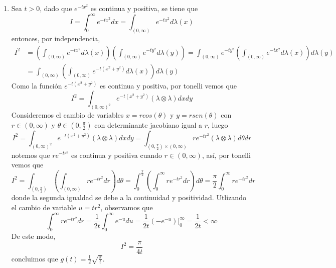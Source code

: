 \documentclass{article}
\begin{document}
\begin{enumerate}
    \item Sea $t>0$, dado que $e^{-tx^{2}}$ es continua y positiva, se tiene que
    \begin{equation*}
        I=\int_{0}^{\infty}e^{-tx^{2}}dx=\int_{(0,\infty)}e^{-tx^{2}}d\lambda(x)
    \end{equation*}
    entonces, por independencia,
    \begin{align*}
        I^{2} &= \left(\int_{(0,\infty)}e^{-tx^{2}}d\lambda(x)\right)
        \left(\int_{(0,\infty)}e^{-ty^{2}}d\lambda(y)\right)
        =\int_{(0,\infty)}e^{-ty^{2}}\left(\int_{(0,\infty)}e^{-tx^{2}}d\lambda(x)\right)
        d\lambda(y) \\[2mm]
        &= \int_{(0,\infty)}\left(\int_{(0,\infty)}e^{-t(x^{2}+y^{2})}d\lambda(x)\right)d\lambda(y)
    \end{align*}
    Como la función $e^{-t(x^{2}+y^{2})}$ es continua y positiva, por tonelli vemos que
    \begin{equation*}
        I^{2}=\int_{(0,\infty)^{2}}e^{-t(x^{2}+y^{2})}(\lambda\otimes\lambda)dxdy
    \end{equation*}
    Consideremos el cambio de variables $x=rcos(\theta)$ y $y=rsen(\theta)$ con $r\in(0,\infty)$ y 
    $\theta\in(0,\frac{\pi}{2})$ con determinante jacobiano igual a $r$, luego
    \begin{equation*}
        I^{2}=\int_{(0,\infty)^{2}}e^{-t(x^{2}+y^{2})}(\lambda\otimes\lambda)dxdy
        =\int_{\left(0,\frac{\pi}{2}\right)\times(0,\infty)}re^{-tr^{2}}(\lambda\otimes\lambda)
        d\theta dr
    \end{equation*}
    notemos que $re^{-tr^{2}}$ es continua y positiva cuando $r\in(0,\infty)$, así, por tonelli
    vemos que
    \begin{equation*}
        I^{2}=\int_{\left(0,\frac{\pi}{2}\right)}\left(\int_{(0,\infty)}re^{-tr^{2}}
        dr\right)d\theta
        =\int_{0}^{\frac{\pi}{2}}\left(\int_{0}^{\infty}re^{-tr^{2}}
        dr\right)d\theta
        =\frac{\pi}{2}\int_{0}^{\infty}re^{-tr^{2}}dr
    \end{equation*}
    donde la segunda igualdad se debe a la continuidad y positividad. Utlizando el cambio de 
    variable $u=tr^{2}$, observamos que
    \begin{equation*}
        \int_{0}^{\infty}re^{-tr^{2}}dr=\frac{1}{2t}\int_{0}^{\infty}e^{-u}du
        =\frac{1}{2t}(-e^{-u})\Big|_{0}^{\infty}=\frac{1}{2t}<\infty
    \end{equation*}
    De este modo,
    \begin{equation*}
        I^{2}=\frac{\pi}{4t}
    \end{equation*}
    concluimos que $g(t)=\frac{1}{2}\sqrt{\frac{\pi}{t}}$.
    \newpage
    

\end{enumerate}
\end{document}
